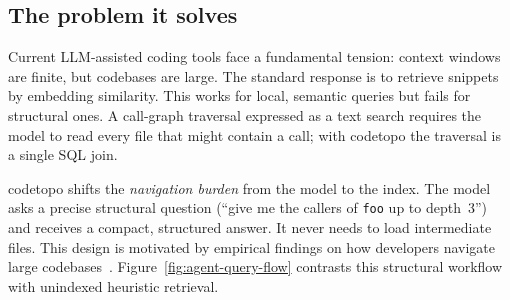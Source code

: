 \subsection{The problem it solves}

Current LLM-assisted coding tools face a fundamental tension: context windows
are finite, but codebases are large. The standard response is to retrieve
snippets by embedding similarity. This works for local, semantic queries but
fails for structural ones. A call-graph traversal expressed as a text search
requires the model to read every file that might contain a call; with codetopo
the traversal is a single SQL join.

codetopo shifts the \emph{navigation burden} from the model to the index.
The model asks a precise structural question (``give me the callers of
\texttt{foo} up to depth~3'') and receives a compact, structured answer. It
never needs to load intermediate files. This design is motivated by empirical
findings on how developers navigate large codebases~\cite{robillard2004codenav}.
Figure~\ref{fig:agent-query-flow} contrasts this structural workflow with
unindexed heuristic retrieval.

